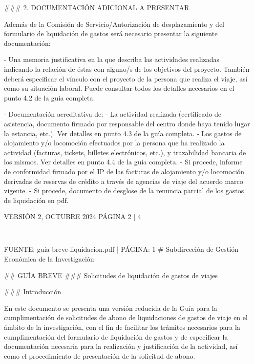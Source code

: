 \documentclass{article}
\begin{document}
\begin{itemize}
\begin{itemize}
\begin{scriptsize}
                  \#\#\# 2. DOCUMENTACIÓN ADICIONAL A PRESENTAR

                  Además de la Comisión de Servicio/Autorización de desplazamiento y del formulario de liquidación de gastos será necesario presentar la siguiente documentación:

                  - Una memoria justificativa en la que describa las actividades realizadas indicando la relación de éstas con alguno/s de los objetivos del proyecto. También deberá especificar el vínculo con el proyecto de la persona que realiza el viaje, así como su situación laboral. Puede consultar todos los detalles necesarios en el punto 4.2 de la guía completa.

                  - Documentación acreditativa de:
                  - La actividad realizada (certificado de asistencia, documento firmado por responsable del centro donde haya tenido lugar la estancia, etc.). Ver detalles en punto 4.3 de la guía completa.
                  - Los gastos de alojamiento y/o locomoción efectuados por la persona que ha realizado la actividad (facturas, tickets, billetes electrónicos, etc.), y trazabilidad bancaria de los mismos. Ver detalles en punto 4.4 de la guía completa.
                  - Si procede, informe de conformidad firmado por el IP de las facturas de alojamiento y/o locomoción derivadas de reservas de crédito a través de agencias de viaje del acuerdo marco vigente.
                  - Si procede, documento de desglose de la renuncia parcial de los gastos de liquidación en pdf.

                  VERSIÓN 2, OCTUBRE 2024    PÁGINA 2 | 4

                  ---

                  FUENTE: guia-breve-liquidacion.pdf | PÁGINA: 1
                  \# Subdirección de Gestión Económica de la Investigación

                  \#\# GUÍA BREVE
                  \#\#\# Solicitudes de liquidación de gastos de viajes

                  \#\#\# Introducción

                  En este documento se presenta una versión reducida de la Guía para la cumplimentación de solicitudes de abono de liquidaciones de gastos de viaje en el ámbito de la investigación, con el fin de facilitar los trámites necesarios para la cumplimentación del formulario de liquidación de gastos y de especificar la documentación necesaria para la realización y justificación de la actividad, así como el procedimiento de presentación de la solicitud de abono.


\end{scriptsize}
\end{itemize}
\end{itemize}
\end{document}
